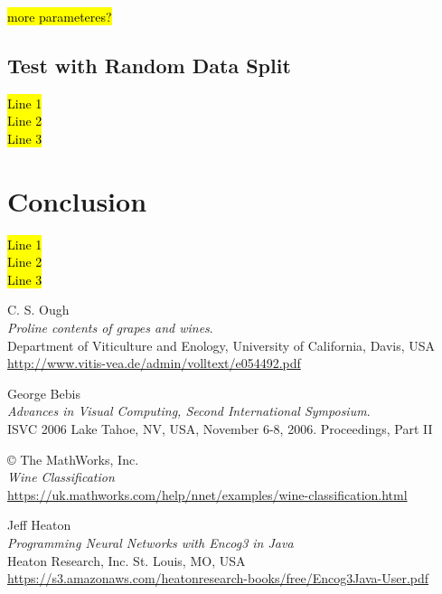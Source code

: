 \documentclass[10pt,twocolumn,letterpaper]{article}
\begin{document}
\hl{more parameteres?}

\subsection{Test with Random Data Split}

\hl{Line 1\\

Line 2\\

Line 3\\}

\section{Conclusion}
\hl{Line 1\\

Line 2\\

Line 3\\}
\begin{thebibliography}{9}
C. S. Ough\\
\textit{Proline contents of grapes and wines}. \\
Department of Viticulture and Enology, University of California, Davis, USA\\
\url{http://www.vitis-vea.de/admin/volltext/e054492.pdf}

George Bebis\\
\textit{Advances in Visual Computing, Second International Symposium}.\\
ISVC 2006 Lake Tahoe, NV, USA, November 6-8, 2006. Proceedings, Part II 

© The MathWorks, Inc.\\
\textit{Wine Classification}\\
\url{https://uk.mathworks.com/help/nnet/examples/wine-classification.html}

Jeff Heaton\\
\textit{Programming Neural Networks with Encog3 in Java}\\
Heaton Research, Inc. St. Louis, MO, USA\\
\url{https://s3.amazonaws.com/heatonresearch-books/free/Encog3Java-User.pdf}

\end{thebibliography}
\end{document}
